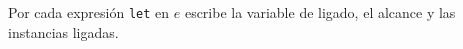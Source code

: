     \begin{exercise}
    Por cada expresión \texttt{let} en $e$ escribe la variable de ligado, el alcance y las instancias ligadas.
    



    \end{exercise}
	
   \bigskip

